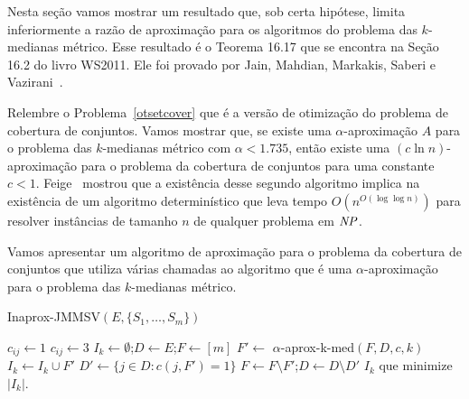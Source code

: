 Nesta seção vamos mostrar um resultado que, sob certa hipótese, limita inferiormente a razão de aproximação para os algoritmos do problema das $k$-medianas métrico. Esse resultado é o Teorema 16.17 que se encontra na Seção 16.2 do livro WS2011. Ele foi provado por Jain, Mahdian, Markakis, Saberi e Vazirani~\cite{jain2002greedy}.

Relembre o Problema~\eqref{otsetcover} que é a versão de otimização do problema de cobertura de conjuntos.
Vamos mostrar que, se existe uma $\alpha$-aproximação $A$ para o problema das $k$-medianas métrico com $\alpha < 1.735$, então existe uma $(c \ln n)$-aproximação para o problema da cobertura de conjuntos para uma constante $c<1$. 
Feige~\cite{Feige98} mostrou que a existência desse segundo algoritmo implica na existência de um algoritmo determinístico que leva tempo $O(n^{O(\log\log n)})$ para resolver instâncias de tamanho $n$ de qualquer problema em $\mathit{NP}$.

Vamos apresentar um algoritmo de aproximação para o problema da cobertura de conjuntos que utiliza várias chamadas ao algoritmo que é uma $\alpha$-aproximação para o problema das $k$-medianas métrico.

\begin{algorithm}
    \caption{\sc Inaprox-JMMSV$(E,\{S_1,\ldots,S_m\})$}
    \begin{algorithmic}[1]
            \State $c_{ij} \gets 1$
            \Else
            \State $c_{ij} \gets 3$
            \EndIf
            \EndFor
        \EndFor
            \State $I_k \gets \emptyset$;\quad $D \gets E$;\quad $F \gets [m]$
                \State $F' \gets$ {\sc $\alpha$-aprox-k-med}$(F,D,c,k)$
                \State $I_k \gets I_k \cup F'$
                \State $D' \gets \{j \in D: c(j,F') = 1 \}$
                \State $F \gets F \setminus F'$;\quad $D\gets D\setminus D'$
            \EndWhile
        \EndFor
    \State \Return $I_k$ que minimize $|I_k|$.
    \end{algorithmic}
\end{algorithm}

